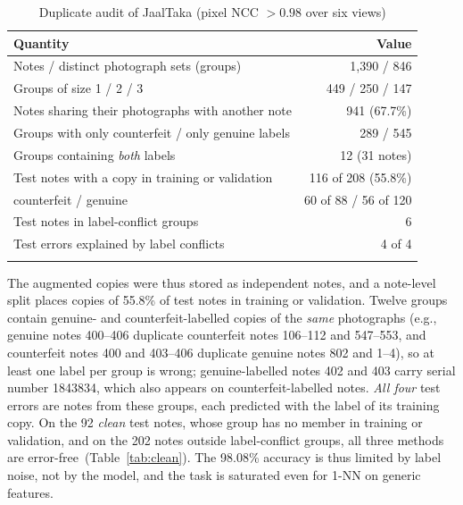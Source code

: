 \documentclass[pdflatex,sn-mathphys-num]{sn-jnl}
\begin{document}
\begin{table}[!t]
\caption{Duplicate audit of JaalTaka (pixel NCC $>0.98$ over six views)}\label{tab:audit}
\begin{tabular*}{\textwidth}{@{\extracolsep\fill}lr}
\toprule
Quantity & Value \\
\midrule
Notes / distinct photograph sets (groups) & 1{,}390 / 846 \\
Groups of size 1 / 2 / 3 & 449 / 250 / 147 \\
Notes sharing their photographs with another note & 941 (67.7\%) \\
Groups with only counterfeit / only genuine labels & 289 / 545 \\
Groups containing \emph{both} labels & 12 (31 notes) \\
\midrule
Test notes with a copy in training or validation & 116 of 208 (55.8\%) \\
\quad counterfeit / genuine & 60 of 88 / 56 of 120 \\
Test notes in label-conflict groups & 6 \\
Test errors explained by label conflicts & 4 of 4 \\
\botrule
\end{tabular*}
\end{table}

The augmented copies were thus stored as independent notes, and a note-level split
places copies of 55.8\% of test notes in training or validation. Twelve groups contain
genuine- and counterfeit-labelled copies of the \emph{same} photographs (e.g., genuine
notes 400--406 duplicate counterfeit notes 106--112 and 547--553, and counterfeit notes
400 and 403--406 duplicate genuine notes 802 and 1--4), so at least one label per group
is wrong; genuine-labelled notes 402 and 403 carry serial number 1843834, which also
appears on counterfeit-labelled notes. \emph{All four} test errors are notes from these
groups, each predicted with the label of its training copy. On the 92 \emph{clean} test
notes, whose group has no member in training or validation, and on the 202 notes outside
label-conflict groups, all three methods are error-free~(Table~\ref{tab:clean}). The
98.08\% accuracy is thus limited by label noise, not by the model, and the task is
saturated even for 1-NN on generic features.
\end{document}
